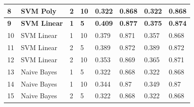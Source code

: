 \documentclass[a4paper]{article}
\begin{document}
\begin{table}[h]
\begin{tabular}{llllllll}
\multicolumn{1}{|l|}{8}   & \multicolumn{1}{l|}{SVM Poly}    & \multicolumn{1}{l|}{2}     & \multicolumn{1}{l|}{10}                   & \multicolumn{1}{l|}{0.322}        & \multicolumn{1}{l|}{0.868}        & \multicolumn{1}{l|}{0.322}    & \multicolumn{1}{l|}{0.868}    \\ \hline
\multicolumn{1}{|l|}{\textbf{9}}   & \multicolumn{1}{l|}{\textbf{SVM Linear}}  & \multicolumn{1}{l|}{\textbf{1}}     & \multicolumn{1}{l|}{\textbf{5}}                    & \multicolumn{1}{l|}{\textbf{0.409}}        & \multicolumn{1}{l|}{\textbf{0.877}}        & \multicolumn{1}{l|}{\textbf{0.375}}    & \multicolumn{1}{l|}{\textbf{0.874}}    \\ \hline
\multicolumn{1}{|l|}{10}  & \multicolumn{1}{l|}{SVM Linear}  & \multicolumn{1}{l|}{1}     & \multicolumn{1}{l|}{10}                   & \multicolumn{1}{l|}{0.379}        & \multicolumn{1}{l|}{0.871}        & \multicolumn{1}{l|}{0.357}    & \multicolumn{1}{l|}{0.868}    \\ \hline
\multicolumn{1}{|l|}{11}  & \multicolumn{1}{l|}{SVM Linear}  & \multicolumn{1}{l|}{2}     & \multicolumn{1}{l|}{5}                    & \multicolumn{1}{l|}{0.389}        & \multicolumn{1}{l|}{0.872}        & \multicolumn{1}{l|}{0.389}    & \multicolumn{1}{l|}{0.872}    \\ \hline
\multicolumn{1}{|l|}{12}  & \multicolumn{1}{l|}{SVM Linear}  & \multicolumn{1}{l|}{2}     & \multicolumn{1}{l|}{10}                   & \multicolumn{1}{l|}{0.353}        & \multicolumn{1}{l|}{0.869}        & \multicolumn{1}{l|}{0.365}    & \multicolumn{1}{l|}{0.871}    \\ \hline
\multicolumn{1}{|l|}{13}  & \multicolumn{1}{l|}{Naive Bayes} & \multicolumn{1}{l|}{1}     & \multicolumn{1}{l|}{5}                    & \multicolumn{1}{l|}{0.322}        & \multicolumn{1}{l|}{0.868}        & \multicolumn{1}{l|}{0.322}    & \multicolumn{1}{l|}{0.868}    \\ \hline
\multicolumn{1}{|l|}{14}  & \multicolumn{1}{l|}{Naive Bayes} & \multicolumn{1}{l|}{1}     & \multicolumn{1}{l|}{10}                   & \multicolumn{1}{l|}{0.344}        & \multicolumn{1}{l|}{0.87}         & \multicolumn{1}{l|}{0.349}    & \multicolumn{1}{l|}{0.87}     \\ \hline
\multicolumn{1}{|l|}{15}  & \multicolumn{1}{l|}{Naive Bayes} & \multicolumn{1}{l|}{2}     & \multicolumn{1}{l|}{5}                    & \multicolumn{1}{l|}{0.322}        & \multicolumn{1}{l|}{0.868}        & \multicolumn{1}{l|}{0.322}    & \multicolumn{1}{l|}{0.868}    \\ \hline

\end{tabular}
\end{table}
\end{document}
